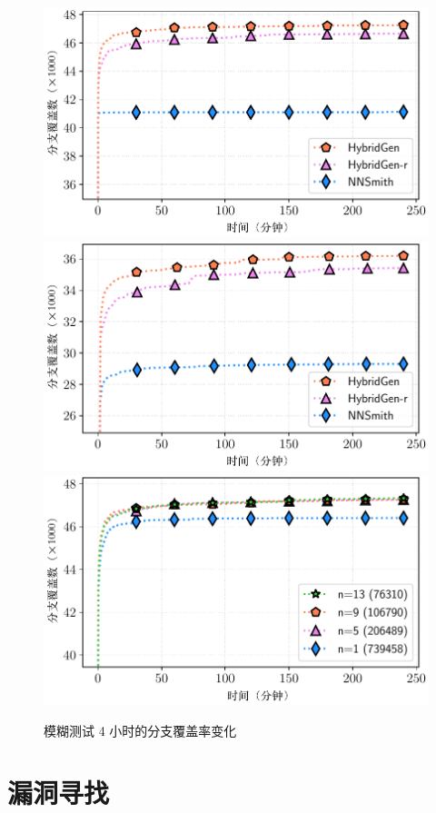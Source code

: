\begin{figure}
    \centering
        {\includegraphics[width=0.48\linewidth]{figures/pt_cov.pdf}}
        {\includegraphics[width=0.48\linewidth]{figures/tf_cov.pdf}}
        {\includegraphics[width=0.48\linewidth]{figures/size_cov.pdf}}
    \caption{模糊测试 4 小时的分支覆盖率变化}
    \label{fig:covexp}
\end{figure}


\section{漏洞寻找}
\label{sec:bug_finding}

